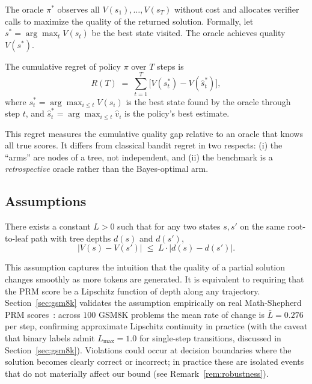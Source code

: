 \begin{definition}
\label{def:oracle}
The oracle $\pi^*$ observes all $V(s_1),\ldots,V(s_T)$ without cost and allocates
verifier calls to maximize the quality of the returned solution. Formally, let
$s^* = \arg\max_t V(s_t)$ be the best state visited. The oracle achieves quality
$V(s^*)$.
\end{definition}

\begin{definition}
\label{def:regret}
The cumulative regret of policy $\pi$ over $T$ steps is
\[
  R(T) \;=\; \sum_{t=1}^{T} \bigl[V(s^*_t) - V(\hat{s}^*_t)\bigr],
\]
where $s^*_t = \arg\max_{i \leq t} V(s_i)$ is the best state found by the oracle
through step $t$, and $\hat{s}^*_t = \arg\max_{i \leq t} \hat{v}_i$ is the policy's
best estimate.
\end{definition}

\begin{remark}
This regret measures the cumulative quality gap relative to an oracle that knows all
true scores. It differs from classical bandit regret in two respects: (i) the
``arms'' are nodes of a tree, not independent, and (ii) the benchmark is a
\emph{retrospective} oracle rather than the Bayes-optimal arm.
\end{remark}

\subsection{Assumptions}
\label{sec:assumptions}

\begin{assumption}
\label{ass:lipschitz}
There exists a constant $L > 0$ such that for any two states $s, s'$ on the same
root-to-leaf path with tree depths $d(s)$ and $d(s')$,
\[
  |V(s) - V(s')| \;\leq\; L \cdot |d(s) - d(s')|.
\]
\end{assumption}

\begin{remark}
This assumption captures the intuition that the quality of a partial solution changes
smoothly as more tokens are generated. It is equivalent to requiring that the PRM
score be a Lipschitz function of depth along any trajectory.
Section~\ref{sec:gsm8k} validates the assumption empirically on real Math-Shepherd
PRM scores~\citep{wang2024math}: across $100$ GSM8K problems the mean rate of change
is $\bar{L}{=}0.276$ per step, confirming approximate Lipschitz continuity in practice
(with the caveat that binary labels admit $L_{\max}{=}1.0$ for single-step transitions,
discussed in Section~\ref{sec:gsm8k}).
Violations could occur at decision boundaries where the solution becomes clearly correct
or incorrect; in practice these are isolated events that do not materially affect our
bound (see Remark~\ref{rem:robustness}).
\end{remark}

